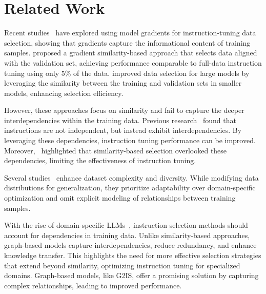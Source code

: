 \section{Related Work}
Recent studies~\cite{park2023trak, jainimproving} have explored using model gradients for instruction-tuning data selection, showing that gradients capture the informational content of training samples.
\citet{xialess} proposed a gradient similarity-based approach that selects data aligned with the validation set, achieving performance comparable to full-data instruction tuning using only 5\% of the data.
\citet{joaquin2024in2core} improved data selection for large models by leveraging the similarity between the training and validation sets in smaller models, enhancing selection efficiency.

However, these approaches focus on similarity and fail to capture the deeper interdependencies within the training data. Previous research~\cite{zhao2024beyond} found that instructions are not independent, but instead exhibit interdependencies. By leveraging these dependencies, instruction tuning performance can be improved. Moreover,~\citet{hubotter2024efficiently} highlighted that similarity-based selection overlooked these dependencies, limiting the effectiveness of instruction tuning.


Several studies~\cite{lu2023instag, bhattexperimental} enhance dataset complexity and diversity.
While modifying data distributions for generalization, they prioritize adaptability over domain-specific optimization and omit explicit modeling of relationships between training samples.

With the rise of domain-specific LLMs~\cite{ wu2023bloomberggpt, zhang2023xuanyuan}, instruction selection methods should account for dependencies in training data.
Unlike similarity-based approaches, graph-based models capture interdependencies, reduce redundancy, and enhance knowledge transfer.
This highlights the need for more effective selection strategies that extend beyond similarity, optimizing instruction tuning for specialized domains.
Graph-based models, like G2IS, offer a promising solution by capturing complex relationships, leading to improved performance.